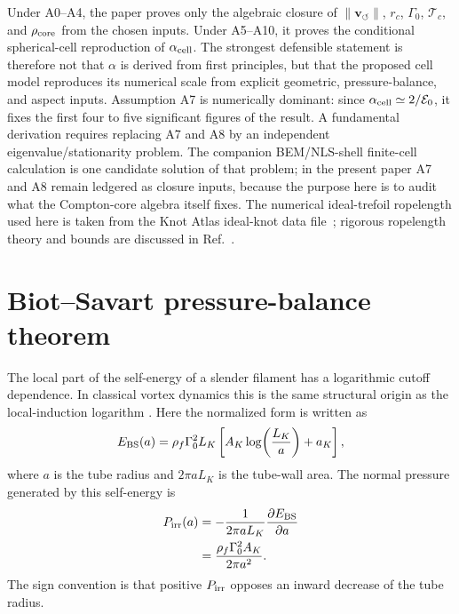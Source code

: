\documentclass[aps,pra,preprint,longbibliography,nofootinbib]{revtex4-2}
\newcommand{\vnorm}{\lVert\mathbf{v}_{\!\boldsymbol{\circlearrowleft}}\rVert} %
\newcommand{\Tc}{\mathcal{T}_c}                  %
\begin{document}
Under A0--A4, the paper proves only the algebraic closure of
$\vnorm$, $r_c$, $\Gamma_0$, $\Tc$, and $\rho_{\rm core}$ from the chosen
inputs.  Under A5--A10, it proves the conditional spherical-cell
reproduction of $\alpha_{\rm cell}$.  The strongest defensible statement is
therefore not that $\alpha$ is derived from first principles, but that the
proposed cell model reproduces its numerical scale from explicit geometric,
pressure-balance, and aspect inputs.  Assumption A7 is numerically
dominant: since $\alpha_{\rm cell}\simeq2/\mathcal E_0$, it fixes the first
four to five significant figures of the result.  A fundamental derivation requires replacing A7 and A8 by an independent
eigenvalue/stationarity problem.  The companion BEM/NLS-shell finite-cell
calculation is one candidate solution of that problem; in the present paper A7
and A8 remain ledgered as closure inputs, because the purpose here is to audit
what the Compton-core algebra itself fixes.  The numerical ideal-trefoil
ropelength used here is taken from
the Knot Atlas ideal-knot data file~\cite{KnotAtlasIdeal}; rigorous
ropelength theory and bounds are discussed in Ref.~\cite{Cantarella2002}.

\section{Biot--Savart pressure-balance theorem}
\label{app:bs_pressure}

The local part of the self-energy of a slender filament has a logarithmic
cutoff dependence.  In classical vortex dynamics this is the same structural
origin as the local-induction logarithm \cite{Saffman1992,Batchelor1967}.
Here the normalized form is written as
\begin{equation}
  E_{\rm BS}(a)
  =\rho_f \Gamma_0^2 L_K
   \left[A_K\log\!\left(\frac{L_K}{a}\right)+a_K\right],
  \label{eq:app_bs_energy}
\end{equation}
where $a$ is the tube radius and $2\pi aL_K$ is the tube-wall area.  The
normal pressure generated by this self-energy is
\begin{align}
  P_{\rm irr}(a)
  &=-\frac{1}{2\pi aL_K}\frac{\partial E_{\rm BS}}{\partial a}
    \nonumber\\
  &=\frac{\rho_f\Gamma_0^2A_K}{2\pi a^2}.
  \label{eq:app_pirr}
\end{align}
The sign convention is that positive $P_{\rm irr}$ opposes an inward decrease
of the tube radius.
\end{document}
